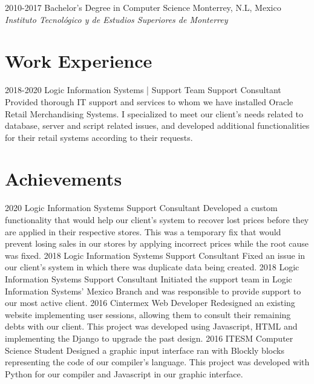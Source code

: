 \documentclass[]{twentysecondcv}
\begin{document}
\begin{twenty}
  \twentyitem
    {2010-2017}
    {Bachelor's Degree {\normalfont in Computer Science}}
    {Monterrey, N.L, Mexico}
    {\emph{Instituto Tecnológico y de Estudios Superiores de Monterrey}}
\end{twenty}


\section{Work Experience}

\begin{twenty}
  \twentyitem
    {2018-2020}
    {Logic Information Systems | Support Team}
    {Support Consultant}
    {Provided thorough IT support and services to whom we have installed Oracle Retail Merchandising Systems. I specialized to meet our client's needs related to database, server and script related issues, and developed additional functionalities for their retail systems according to their requests.}
\end{twenty}



\section{Achievements}

\begin{twenty}
  \twentyitem
    {2020}
    {Logic Information Systems}
    {Support Consultant}
    {Developed a custom functionality that would help our client’s system to recover lost prices before they are applied in their respective stores. This was a temporary fix that would prevent losing sales in our stores by applying incorrect prices while the root cause was fixed.}
  \twentyitem
    {2018}
    {Logic Information Systems}
    {Support Consultant}
    {Fixed an issue in our client’s system in which there was duplicate data being created.}
  \twentyitem
    {2018}
    {Logic Information Systems}
    {Support Consultant}
    {Initiated the support team in Logic Information Systems’ Mexico Branch and was responsible to provide support to our most active client.}
\twentyitem
    {2016}
    {Cintermex}
    {Web Developer}
    {Redesigned an existing website implementing user sessions, allowing them to consult their remaining debts with our client. This project was developed using Javascript, HTML and implementing the Django to upgrade the past design.}
\twentyitem
    {2016}
    {ITESM}
    {Computer Science Student}
    {Designed a graphic input interface ran with Blockly blocks representing the code of our compiler's language. This project was developed with Python for our compiler and Javascript in our graphic interface.}
\end{twenty}
\end{document}
